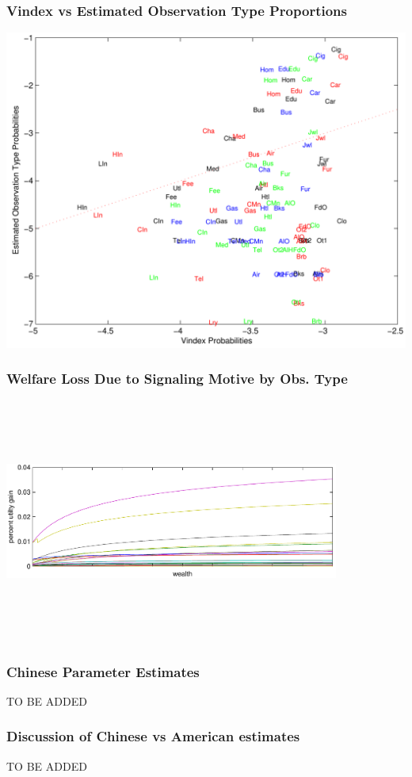 \documentclass{beamer}
\begin{document}
  \begin{frame}
    \frametitle{Vindex vs Estimated Observation Type Proportions}
    \includegraphics[scale=.58]{pics/vinmatch_cropped.pdf}
  \end{frame}
  \begin{frame}
    \frametitle{Welfare Loss Due to Signaling Motive by Obs. Type} 
    \includegraphics[width=11cm, height=8cm]{pics/uchnge_cropped_nohouse.pdf} 
  \end{frame}
  \begin{frame}
    \frametitle{Chinese Parameter Estimates}
    TO BE ADDED
  \end{frame}
  \begin{frame}
    \frametitle{Discussion of Chinese vs American estimates}
    TO BE ADDED
  \end{frame}
\end{document}
